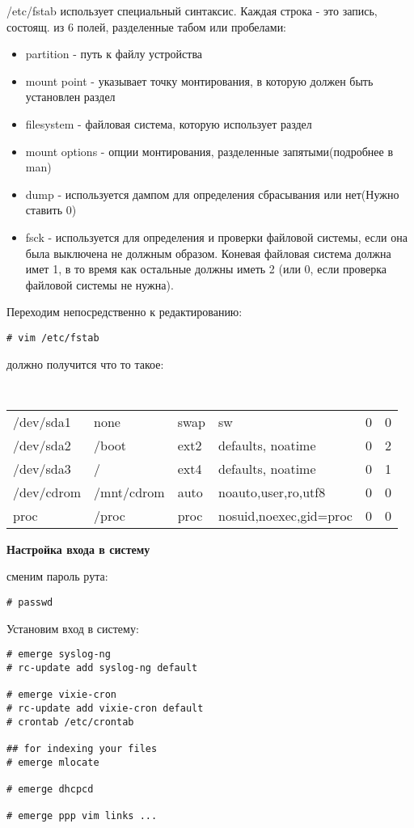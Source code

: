 \documentclass[12pt, a6paper]{article}
\begin{document}
/etc/fstab использует специальный синтаксис. Каждая строка - это запись, состоящ. из 6 полей, разделенные табом или пробелами:
\begin{itemize}
\item partition - путь к файлу устройства
\item mount point - указывает точку монтирования, в которую должен быть установлен раздел
\item filesystem - файловая система, которую использует раздел
\item mount options - опции монтирования, разделенные запятыми(подробнее в man)
\item dump - используется дампом для определения сбрасывания или нет(Нужно ставить 0)
\item fsck - используется для определения и проверки файловой системы, если она была выключена не должным образом. Коневая файловая система должна имет 1, в то время как остальные должны иметь 2 (или 0, если проверка файловой системы не нужна).
\end{itemize}

Переходим непосредственно к редактированию:

\begin{verbatim}
# vim /etc/fstab
\end{verbatim}

должно получится что то такое:
\newline

{
\tt
\begin{tabular}{llllcc}
/dev/sda1 & none & swap & sw & 0 & 0 \\
/dev/sda2 & /boot & ext2 & defaults, noatime & 0 & 2\\
/dev/sda3 & / & ext4 & defaults, noatime & 0 & 1 \\
/dev/cdrom& /mnt/cdrom & auto & noauto,user,ro,utf8 & 0 & 0 \\
proc & /proc & proc & nosuid,noexec,gid=proc & 0 & 0 \\
\end{tabular}
}

{\bf Настройка входа в систему}

сменим пароль рута:

\begin{verbatim}
# passwd
\end{verbatim}

Установим вход в систему:

\begin{verbatim}
# emerge syslog-ng
# rc-update add syslog-ng default

# emerge vixie-cron
# rc-update add vixie-cron default
# crontab /etc/crontab

## for indexing your files
# emerge mlocate

# emerge dhcpcd

# emerge ppp vim links ...
\end{verbatim}
\end{document}
